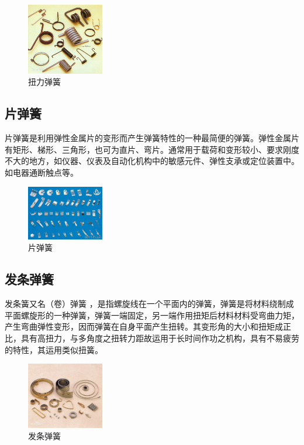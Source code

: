\documentclass[UTF8]{article} %
\begin{document}
\begin{figure}[h]
  \centering
  \includegraphics[width=0.3\textwidth]{th.png}
  \caption{扭力弹簧}
\end{figure}


\subsection{片弹簧}
片弹簧是利用弹性金属片的变形而产生弹簧特性的一种最简便的弹簧。弹性金属片有矩形、梯形、三角形，也可为直片、弯片。通常用于载荷和变形较小、要求刚度不大的地方，如仪器、仪表及自动化机构中的敏感元件、弹性支承或定位装置中。如电器通断触点等。

\begin{figure}[h]
  \centering
  \includegraphics[width=0.3\textwidth]{th3.png}
  \caption{片弹簧}
\end{figure}


\subsection{发条弹簧}
发条簧又名（卷）弹簧 ，是指螺旋线在一个平面内的弹簧，弹簧是将材料绕制成平面螺旋形的一种弹簧，弹簧一端固定，另一端作用扭矩后材料材料受弯曲力矩，产生弯曲弹性变形，因而弹簧在自身平面产生扭转。其变形角的大小和扭矩成正比，具有高扭力，与多角度之扭转力距故运用于长时间作功之机构，具有不易疲劳的特性，其运用类似扭簧。

\begin{figure}[h]
  \centering
  \includegraphics[width=0.3\textwidth]{th4.png}
  \caption{发条弹簧}
\end{figure}
\end{document}
